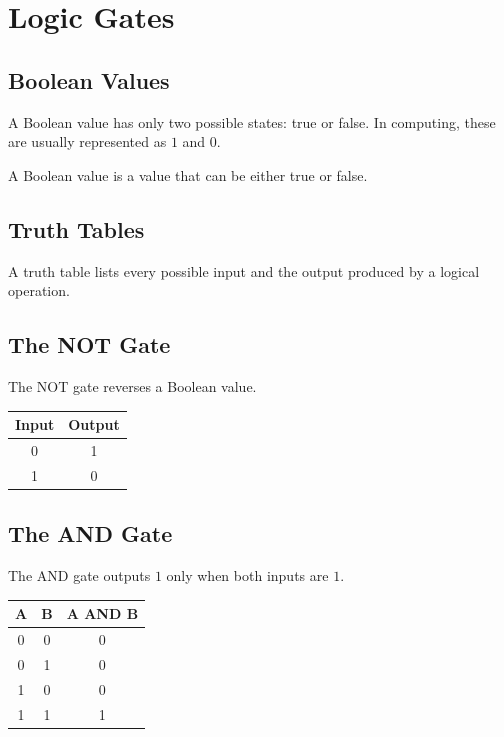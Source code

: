 
\chapter{Logic Gates}
\label{chap:logic-gates}



\section{Boolean Values}
A Boolean value has only two possible states: true or false. In computing, these are usually represented as \(1\) and \(0\).
\begin{definition}A Boolean value is a value that can be either true or false.\end{definition}

\section{Truth Tables}
A truth table lists every possible input and the output produced by a logical operation.

\section{The NOT Gate}
The NOT gate reverses a Boolean value.
\begin{center}\begin{tabular}{cc}\toprule Input & Output \\\midrule 0 & 1\\ 1 & 0\\\bottomrule\end{tabular}\end{center}

\section{The AND Gate}
The AND gate outputs \(1\) only when both inputs are \(1\).
\begin{center}\begin{tabular}{ccc}\toprule A & B & A AND B \\\midrule 0&0&0\\0&1&0\\1&0&0\\1&1&1\\\bottomrule\end{tabular}\end{center}

